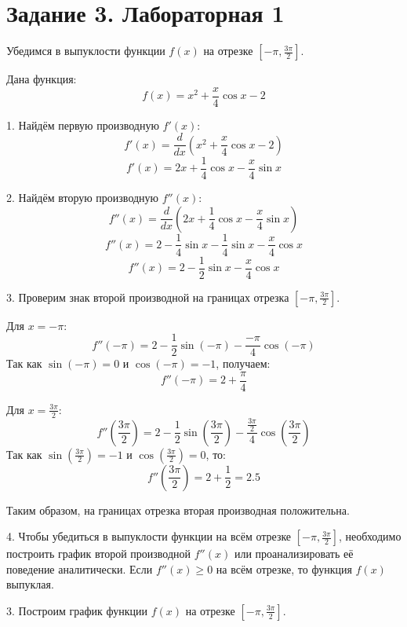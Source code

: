\documentclass[a4paper,12pt]{article}
\begin{document}
\section*{Задание 3. Лабораторная 1}

Убедимся в выпуклости функции \( f(x) \) на отрезке \( \left[ -\pi, \frac{3\pi}{2} \right] \).

Дана функция:
\[
f(x) = x^2 + \frac{x}{4} \cos x - 2
\]

1. Найдём первую производную \( f'(x) \):
\[
f'(x) = \frac{d}{dx} \left( x^2 + \frac{x}{4} \cos x - 2 \right)
\]
\[
f'(x) = 2x + \frac{1}{4} \cos x - \frac{x}{4} \sin x
\]

2. Найдём вторую производную \( f''(x) \):
\[
f''(x) = \frac{d}{dx} \left( 2x + \frac{1}{4} \cos x - \frac{x}{4} \sin x \right)
\]
\[
f''(x) = 2 - \frac{1}{4} \sin x - \frac{1}{4} \sin x - \frac{x}{4} \cos x
\]
\[
f''(x) = 2 - \frac{1}{2} \sin x - \frac{x}{4} \cos x
\]

3. Проверим знак второй производной на границах отрезка \( \left[ -\pi, \frac{3\pi}{2} \right] \).

Для \( x = -\pi \):
\[
f''(-\pi) = 2 - \frac{1}{2} \sin(-\pi) - \frac{-\pi}{4} \cos(-\pi)
\]
Так как \( \sin(-\pi) = 0 \) и \( \cos(-\pi) = -1 \), получаем:
\[
f''(-\pi) = 2 + \frac{\pi}{4}
\]

Для \( x = \frac{3\pi}{2} \):
\[
f''\left( \frac{3\pi}{2} \right) = 2 - \frac{1}{2} \sin\left( \frac{3\pi}{2} \right) - \frac{\frac{3\pi}{2}}{4} \cos\left( \frac{3\pi}{2} \right)
\]
Так как \( \sin\left( \frac{3\pi}{2} \right) = -1 \) и \( \cos\left( \frac{3\pi}{2} \right) = 0 \), то:
\[
f''\left( \frac{3\pi}{2} \right) = 2 + \frac{1}{2} = 2.5
\]

Таким образом, на границах отрезка вторая производная положительна.

4. Чтобы убедиться в выпуклости функции на всём отрезке \( \left[ -\pi, \frac{3\pi}{2} \right] \), необходимо построить график второй производной \( f''(x) \) или проанализировать её поведение аналитически. Если \( f''(x) \geq 0 \) на всём отрезке, то функция \( f(x) \) выпуклая.

3. Построим график функции \( f(x) \) на отрезке \( \left[ -\pi, \frac{3\pi}{2} \right] \).

\begin{center}
\end{center}
\end{document}
